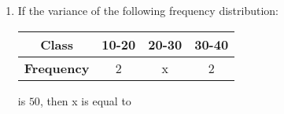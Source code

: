 \documentclass[journal]{IEEEtran}
\begin{document}
\begin{enumerate}[start=16]
\item If the variance of the following frequency distribution:

\begin{center}
\begin{tabular}{|c|c|c|c|}
\hline
\textbf{Class}     & 10-20 & 20-30 & 30-40 \\
\hline
\textbf{Frequency} & 2     & x     & 2     \\
\hline
\end{tabular}
\end{center}

is $50$, then  x is equal to \underline{\hspace{1cm}}



\end{enumerate}
\end{document}
